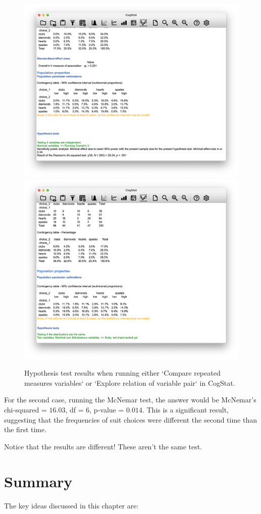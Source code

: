 \documentclass[
  11pt,
  a4paper,
  twoside,symmetric,openright]{book}
\theoremstyle{break}
\theoremstyle{break}
\begin{document}
\begin{figure}

{\centering \includegraphics[width=0.6\linewidth]{resources/image/cogstatmcn1} \includegraphics[width=0.6\linewidth]{resources/image/cogstatmcn2} 

}

\caption{Hypothesis test results when running either `Compare repeated measures variables` or `Explore relation of variable pair` in CogStat.}\label{fig:cogstatmcn}
\end{figure}

For the second case, running the McNemar test, the answer would be McNemar's chi-squared = \(16.03\), df = \(6\), p-value = \(0.014\). This is a significant result, suggesting that the frequencies of suit choices were different the second time than the first time.

Notice that the results are different! These aren't the same test.

\section{Summary}\label{summary-6}

The key ideas discussed in this chapter are:
\end{document}
